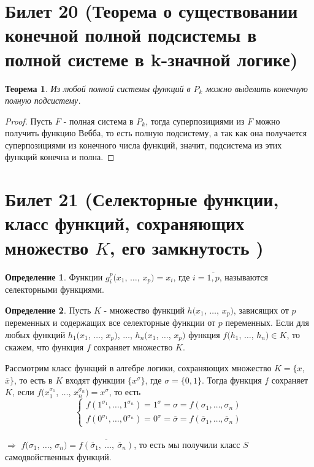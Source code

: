 \documentclass[a4paper, 12pt]{article}
\theoremstyle{definition}
\newtheorem*{definition}{Определение}
\theoremstyle{plain}
\newtheorem*{theorem}{Теорема}
\theoremstyle{remark}
\begin{document}
  \section{Билет 20 (Теорема о существовании конечной полной подсистемы в полной системе в k-значной логике)}
  \begin{theorem}
    Из любой полной системы функций в $P_k$ можно выделить конечную полную подсистему.
  \end{theorem}
  \begin{proof}
    Пусть $F$ - полная система в $P_k$, тогда суперпозициями из $F$ можно получить функцию Вебба, то есть полную подсистему, а так как она получается суперпозициями из конечного числа функций, значит, подсистема из этих функций конечна и полна.
  \end{proof}
  \section{Билет 21 (Селекторные функции, класс функций, сохраняющих множество $K$, его замкнутость )}
  \begin{definition}
    Функции $g_i^p(x_1$, $\ldots$, $x_p)=x_i$, где $i=\overline{1,p}$,  называются селекторными функциями.
  \end{definition}
  \begin{definition}
    Пусть $K$ - множество функций $h(x_1$, $\ldots$, $x_p)$, зависящих от $p$ переменных и содержащих все селекторные функции от $p$ переменных. Если для любых функций $h_1(x_1$, $\ldots$, $x_p)$, $\ldots$, $h_n(x_1$, $\ldots$, $x_p)$ функция $f(h_1$, $\ldots$, $h_n)\in K$, то скажем, что функция $f$ сохраняет множество $K$.
  \end{definition}
  Рассмотрим класс функций в алгебре логики, сохраняющих множество $K=\{x$, $\overline{x}\}$, то есть в $K$ входят функции $\{x^{\sigma}\}$, где $\sigma=\{0, 1\}$. Тогда функция $f$ сохраняет $K$, если $f(x_1^{\sigma_1}$, $\ldots$, $x_n^{\sigma_n})=x^{\sigma}$, то есть
  $$\begin{cases}
    f(1^{\sigma_1}, \ldots, 1^{\sigma_n})=1^{\sigma}=\sigma=f(\sigma_1, \ldots, \sigma_n)\\
    f(0^{\sigma_1}, \ldots, 0^{\sigma_n})=0^{\sigma}=\overline{\sigma}=f(\overline{\sigma}_1, \ldots, \overline{\sigma}_n)
  \end{cases}$$\\
  $\Longrightarrow$ $f(\sigma_1$, $\ldots$, $\sigma_n)=\overline{f(\overline{\sigma}_1, \ \ldots, \ \overline{\sigma}_n)}$, то есть мы получили класс $S$ самодвойственных функций.
\end{document}
